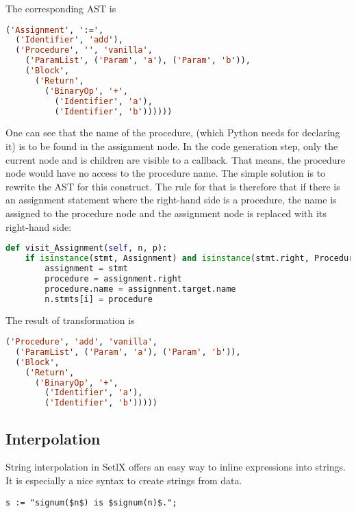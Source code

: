 The corresponding AST is

\begin{lstlisting}[language=lisp]
('Assignment', ':=', 
  ('Identifier', 'add'), 
  ('Procedure', '', 'vanilla', 
    ('ParamList', ('Param', 'a'), ('Param', 'b')), 
    ('Block', 
      ('Return', 
        ('BinaryOp', '+', 
          ('Identifier', 'a'), 
          ('Identifier', 'b'))))))
\end{lstlisting}

One can see that the name of the procedure, (which Python needs for declaring it) is to be found in the assignment node. In the code generation step, only the current node and is children are visible to a callback. That means, the procedure node would have no access to the procedure name. The simple solution is to rewrite the AST for this construct. The rule for that is therefore that if there is an assignment statement where the right-hand side is a procedure, the name is assigned to the procedure node and the assignment node is replaced with its right-hand side:

\begin{lstlisting}[language=python]
def visit_Assignment(self, n, p):
    if isinstance(stmt, Assignment) and isinstance(stmt.right, Procedure):
        assignment = stmt
        procedure = assignment.right
        procedure.name = assignment.target.name
        n.stmts[i] = procedure
\end{lstlisting}

The result of transformation is

\begin{lstlisting}[language=lisp]
('Procedure', 'add', 'vanilla', 
  ('ParamList', ('Param', 'a'), ('Param', 'b')), 
  ('Block', 
    ('Return', 
      ('BinaryOp', '+',
        ('Identifier', 'a'), 
        ('Identifier', 'b')))))
\end{lstlisting}


%
\subsection{Interpolation}

String interpolation in SetlX offers an easy way to inline expressions into strings. It is especially a nice syntax to create strings from data. 

\begin{lstlisting}
s := "signum($n$) is $signum(n)$.";
\end{lstlisting}

